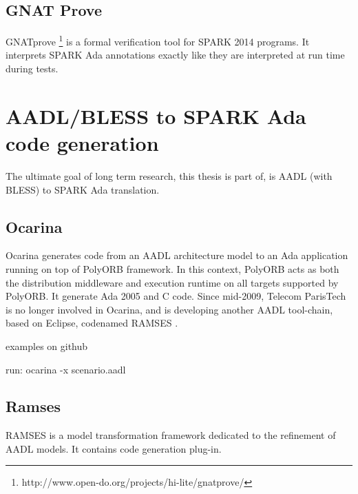 \subsection{GNAT Prove}
\label{background:spark:gnatprove}
GNATprove \footnote{http://www.open-do.org/projects/hi-lite/gnatprove/} is a formal verification tool for SPARK 2014 programs. It interprets SPARK Ada annotations exactly like they are interpreted at run time during tests.


\section{AADL/BLESS to SPARK Ada code generation}
\label{background:codegen}
The ultimate goal of long term research, this thesis is part of, is AADL (with BLESS) to SPARK Ada translation.


\subsection{Ocarina}
\label{background:codegen:ocarina}
Ocarina \cite{Ocarina:Paper,Ocarina:Paper} generates code from an AADL architecture model to an Ada application running on top of PolyORB framework. In this context, PolyORB acts as both the distribution middleware and execution runtime on all targets supported by PolyORB.
It generate Ada 2005 and C code.
Since mid-2009, Telecom ParisTech is no longer involved in Ocarina, and is developing another AADL tool-chain, based on Eclipse, codenamed RAMSES \cite{Ocarina:About:Online}.

examples on github

run:
ocarina -x scenario.aadl



\subsection{Ramses}
\label{background:codegen:ramses}
RAMSES is a model transformation framework dedicated to the refinement of AADL models. It contains code generation plug-in.
